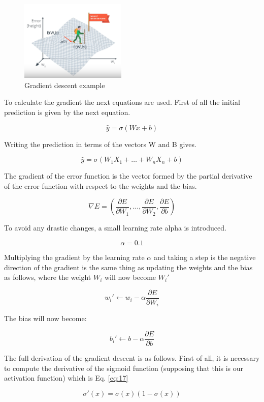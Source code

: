 \documentclass{article}
\begin{document}
\begin{figure}[ht]
    \centering
    \includegraphics[width=0.45\textwidth,height=0.45\textheight,keepaspectratio]{images/gradient.png}
    \captionsetup{justification=centering}
    \caption{Gradient descent example}
    \label{fig:f26}
\end{figure}

To calculate the gradient the next equations are used. First of all the initial prediction is given by the next equation.

\[\hat{y} = \sigma(Wx + b)\]

Writing the prediction in terms of the vectors W and B gives.

\[\hat{y} = \sigma(W_1X_1 + \dots + W_nX_n + b)\]

The gradient of the error function is the vector formed by the partial derivative of the error function with respect to the weights and the bias.

\[\nabla E = (\frac{\partial E}{\partial W_1}, \dots, \frac{\partial E}{\partial W_2}, \frac{\partial E}{\partial b})\]

To avoid any drastic changes, a small learning rate alpha is introduced.

\[\alpha = 0.1\]

Multiplying the gradient by the learning rate \(\alpha\) and taking a step is the negative direction of the gradient is the same thing as updating the weights and the bias as follows, where the weight \(W_i\) will now become \(W_i'\)

\[w_i' \leftarrow w_i - \alpha \frac{\partial E}{\partial W_i}\]

The bias will now become:

\[b_i' \leftarrow b - \alpha \frac{\partial E}{\partial b}\]

The full derivation of the gradient descent is as follows. First of all, it is necessary to compute the derivative of the sigmoid function (supposing that this is our activation function) which is Eq. \eqref{eq:17}

\begin{equation}
\label{eq:17}
\sigma'(x) = \sigma(x)(1 - \sigma(x)) 
\end{equation} 
\end{document}
